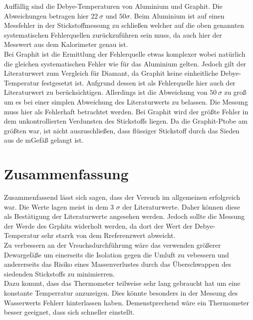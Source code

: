 Auffällig sind die Debye-Temperaturen von Aluminium und Graphit. Die Abweichungen betragen hier $22 \ \sigma$ und $50 \sigma$.
Beim Aluminium ist auf einen Messfehler in der Stickstoffmessung zu schließen welcher auf die oben genannten systematischen Fehlerquellen zurückzuführen sein muss, da auch hier der
Messwert aus dem Kalorimeter genau ist.\\
Bei Graphit ist die Ermittlung der Fehlerquelle etwas komplexer wobei natürlich die gleichen systematischen Fehler wie für das Aluminium gelten.
Jedoch gilt der Literaturwert zum Vergleich für Diamant, da Graphit keine einheitliche Debye-Temperatur festgesetzt ist.
Aufgrund dessen ist als Fehlerquelle hier auch der Literaturwert zu berücksichtigen.
Allerdings ist die Abweichung von $50 \ \sigma$ zu groß um es bei einer simplen Abweichung des Literaturwerts zu belassen.
Die Messung muss hier als Fehlerhaft betrachtet werden. Bei Graphit wird der größte Fehler in dem unkontrollierten Verdunsten des Stickstoffs liegen.
Da die Graphit-Ptobe am größten war, ist nicht auszuschließen, dass flüssiger Stickstoff durch das Sieden aus de mGefäß gelangt ist.

\section{Zusammenfassung}

Zusammenfassend lässt sich sagen, dass der Versuch im allgemeinen erfolgreich war.
Die Werte lagen meist in dem 3 $\sigma$ der Literaturwerte. Daher können diese als Bestätigung der Literaturwerte angesehen werden.
Jedoch sollte die Messung der Werde des Grphits widerholt werden, da dort der Wert der Debye-Temperatur sehr starrk von dem Rreferenzwert abweicht.\\

Zu verbessern an der Vrsuchsdurchführung wäre das verwenden größerer Dewargefäße um einerseits die Isolation gegen
die Umluft zu vebessern und andererseits das Risiko eines Massenverlustes durch das Überschwappen des siedenden Stickstoffs zu minimierren.\\
Dazu kommt, dass das Thermometer teilweise sehr lang gebraucht hat um eine konstante Temperratur anzuzeigen. Dies könnte besonders in der Messung des Wasserwerts Fehlerr hinterlassen haben.
Demenstprechend wäre ein Thermometer besser geeignet, dass sich schneller einstellt.
